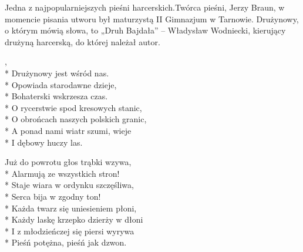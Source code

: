 \begin{info}Jedna z najpopularniejszych pieśni harcerskich.Twórca pieśni, Jerzy Braun, w momencie pisania utworu był maturzystą II Gimnazjum w Tarnowie. Drużynowy, o którym mówią słowa, to „Druh Bajdała” – Władysław Wodniecki, kierujący drużyną harcerską, do której należał autor.\end{info}

\begin{lyrics}[longestline={\vin O obrońcach naszych polskich granic,}]

,\\*
Drużynowy jest wśród nas.\\*
Opowiada starodawne dzieje,\\*
Bohaterski wskrzesza czas.\\*
\vin O rycerstwie spod kresowych stanic,\\*
\vin O obrońcach naszych polskich granic,\\*
\vin A ponad nami wiatr szumi, wieje\\*
\vin I dębowy huczy las.

Już do powrotu głos trąbki wzywa,\\*
Alarmują ze wszystkich stron!\\*
Staje wiara w ordynku szczęśliwa,\\*
Serca bija w zgodny ton!\\*
\vin Każda twarz się uniesieniem płoni,\\*
\vin Każdy laskę krzepko dzierży w dłoni\\*
\vin I z młodzieńczej się piersi wyrywa\\*
\vin Pieśń potężna, pieśń jak dzwon.
\end{lyrics}




